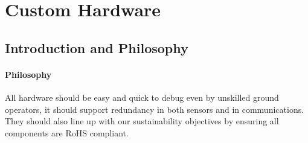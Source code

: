 \newpage
{}
\section{Custom Hardware} \label{section:Custom Hardware}

\subsection{Introduction and Philosophy}
\paragraph{Philosophy}
All hardware should be easy and quick to debug even by unskilled ground operators, it should support redundancy in both sensors and in communications. They should also line up with our sustainability objectives by ensuring all components are \gls{RoHS} compliant.


